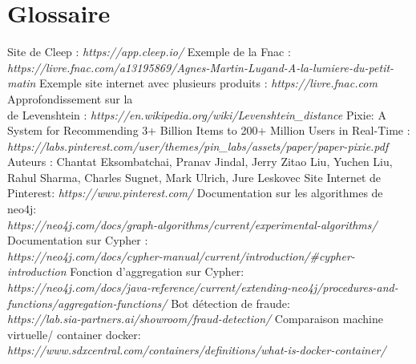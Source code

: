 \documentclass{article} %
\begin{document}
\newpage

\section{Glossaire}
\begin{thebibliography}{9}
	Site de Cleep : \textit{https://app.cleep.io/}
	Exemple de la Fnac : \textit{https://livre.fnac.com/a13195869/Agnes-Martin-Lugand-A-la-lumiere-du-petit-matin}
	Exemple site internet avec plusieurs produits : \textit{https://livre.fnac.com}
	Approfondissement sur la \\
	 de Levenshtein : \textit{https://en.wikipedia.org/wiki/Levenshtein\_distance}
	Pixie: A System for Recommending 3+ Billion Items to 200+ Million Users in Real-Time :
	\textit{https://labs.pinterest.com/user/themes/pin\_labs/assets/paper/paper-pixie.pdf}\\
	Auteurs : Chantat Eksombatchai, Pranav Jindal, Jerry Zitao Liu, Yuchen Liu,
	Rahul Sharma, Charles Sugnet, Mark Ulrich, Jure Leskovec
	Site Internet de Pinterest: \textit{https://www.pinterest.com/}
	Documentation sur les algorithmes de neo4j: \\ \textit{https://neo4j.com/docs/graph-algorithms/current/experimental-algorithms/}
	Documentation sur Cypher :\\
	\textit{https://neo4j.com/docs/cypher-manual/current/introduction/\#cypher-introduction}
	Fonction d'aggregation sur Cypher:\\
	\textit{https://neo4j.com/docs/java-reference/current/extending-neo4j/procedures-and-functions/aggregation-functions/}
	Bot détection de fraude:\\
	\textit{https://lab.sia-partners.ai/showroom/fraud-detection/}
	Comparaison machine virtuelle/ container docker:\\
	\textit{https://www.sdxcentral.com/containers/definitions/what-is-docker-container/}
	
\end{thebibliography}
\newpage






\imtaMakeCover
\end{document}

